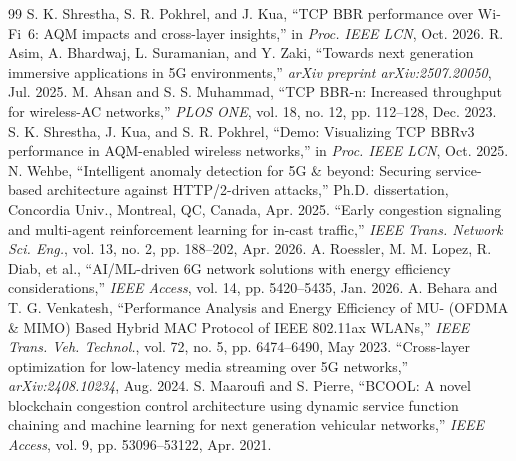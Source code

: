 \documentclass[journal]{IEEEtran}
\begin{document}
\begin{thebibliography}{99}
 S. K. Shrestha, S. R. Pokhrel, and J. Kua, ``TCP BBR performance over Wi-Fi~6: AQM impacts and cross-layer insights,'' in \emph{Proc. IEEE LCN}, Oct. 2026.
 R. Asim, A. Bhardwaj, L. Suramanian, and Y. Zaki, ``Towards next generation immersive applications in 5G environments,'' \emph{arXiv preprint arXiv:2507.20050}, Jul. 2025.
 M. Ahsan and S. S. Muhammad, ``TCP BBR-n: Increased throughput for wireless-AC networks,'' \emph{PLOS ONE}, vol. 18, no. 12, pp. 112--128, Dec. 2023.
 S. K. Shrestha, J. Kua, and S. R. Pokhrel, ``Demo: Visualizing TCP BBRv3 performance in AQM-enabled wireless networks,'' in \emph{Proc. IEEE LCN}, Oct. 2025.
 N. Wehbe, ``Intelligent anomaly detection for 5G \& beyond: Securing service-based architecture against HTTP/2-driven attacks,'' Ph.D. dissertation, Concordia Univ., Montreal, QC, Canada, Apr. 2025.
 ``Early congestion signaling and multi-agent reinforcement learning for in-cast traffic,'' \emph{IEEE Trans. Network Sci. Eng.}, vol. 13, no. 2, pp. 188--202, Apr. 2026.
 A. Roessler, M. M. Lopez, R. Diab, et al., ``AI/ML-driven 6G network solutions with energy efficiency considerations,'' \emph{IEEE Access}, vol. 14, pp. 5420--5435, Jan. 2026.
 A. Behara and T. G. Venkatesh, ``Performance Analysis and Energy Efficiency of MU- (OFDMA \& MIMO) Based Hybrid MAC Protocol of IEEE 802.11ax WLANs,'' \emph{IEEE Trans. Veh. Technol.}, vol. 72, no. 5, pp. 6474--6490, May 2023.
 ``Cross-layer optimization for low-latency media streaming over 5G networks,'' \emph{arXiv:2408.10234}, Aug. 2024.
 S. Maaroufi and S. Pierre, ``BCOOL: A novel blockchain congestion control architecture using dynamic service function chaining and machine learning for next generation vehicular networks,'' \emph{IEEE Access}, vol. 9, pp. 53096--53122, Apr. 2021.


\end{thebibliography}
\end{document}
